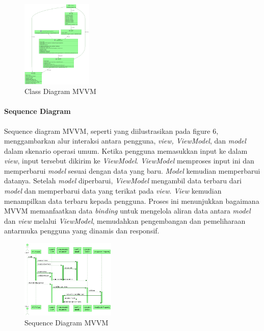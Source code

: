 \documentclass[conference]{IEEEtran}
\begin{document}
	\begin{figure}[h]
		\centering
		\includegraphics[width=0.3\textwidth]{../Class_Sequence_Diagram/out/MVVM_ClassDiagram/MVVM_ClassDiagram}
		\caption{Class Diagram MVVM}
		\label{fig:Class_MVVM}
	\end{figure}
	
	\vspace{5cm}
	
	\paragraph{Sequence Diagram}
	Sequence diagram MVVM, seperti yang diilustrasikan pada figure 6, menggambarkan alur interaksi antara pengguna, \textit{view, ViewModel}, dan \textit{model} dalam skenario operasi umum. Ketika pengguna memasukkan input ke dalam \textit{view}, input tersebut dikirim ke \textit{ViewModel}. \textit{ViewModel} memproses input ini dan memperbarui \textit{model} sesuai dengan data yang baru. \textit{Model} kemudian memperbarui datanya. Setelah \textit{model} diperbarui, \textit{ViewModel} mengambil data terbaru dari \textit{model} dan memperbarui data yang terikat pada \textit{view}. \textit{View} kemudian menampilkan data terbaru kepada pengguna. Proses ini menunjukkan bagaimana MVVM memanfaatkan data \textit{binding} untuk mengelola aliran data antara \textit{model} dan \textit{view} melalui \textit{ViewModel}, memudahkan pengembangan dan pemeliharaan antarmuka pengguna yang dinamis dan responsif.
	
	\begin{figure}[h]
		\centering
		\includegraphics[width=0.4\textwidth]{../Class_Sequence_Diagram/out/MVVM_SequenceDiagram/MVVM_SequenceDiagram}
		\caption{Sequence Diagram MVVM}
		\label{fig:Sequence_MVVM}
	\end{figure}
	
\end{document}
